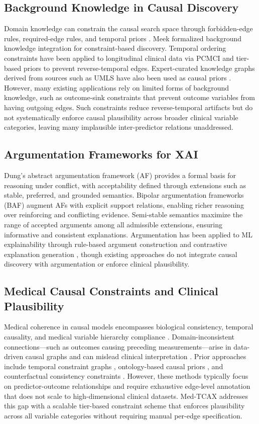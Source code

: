 \documentclass[conference, a4paper]{IEEEtran}
\begin{document}
\subsection{Background Knowledge in Causal Discovery}
Domain knowledge can constrain the causal search space through forbidden-edge rules, required-edge rules, and temporal priors \cite{ref16}. Meek \cite{ref17} formalized background knowledge integration for constraint-based discovery. Temporal ordering constraints have been applied to longitudinal clinical data via PCMCI \cite{ref18} and tier-based priors \cite{ref19} to prevent reverse-temporal edges. Expert-curated knowledge graphs derived from sources such as UMLS have also been used as causal priors \cite{ref20}. However, many existing applications rely on limited forms of background knowledge, such as outcome-sink constraints that prevent outcome variables from having outgoing edges. Such constraints reduce reverse-temporal artifacts but do not systematically enforce causal plausibility across broader clinical variable categories, leaving many implausible inter-predictor relations unaddressed.

\subsection{Argumentation Frameworks for XAI}
Dung's abstract argumentation framework (AF) \cite{ref21} provides a formal basis for reasoning under conflict, with acceptability defined through extensions such as stable, preferred, and grounded semantics. Bipolar argumentation frameworks (BAF) \cite{ref22} augment AFs with explicit support relations, enabling richer reasoning over reinforcing and conflicting evidence. Semi-stable semantics \cite{ref23} maximize the range of accepted arguments among all admissible extensions, ensuring informative and consistent explanations. Argumentation has been applied to ML explainability through rule-based argument construction \cite{ref24} and contrastive explanation generation \cite{ref25}, though existing approaches do not integrate causal discovery with argumentation or enforce clinical plausibility.

\subsection{Medical Causal Constraints and Clinical Plausibility}
Medical coherence in causal models encompasses biological consistency, temporal causality, and medical variable hierarchy compliance \cite{ref7, ref26}. Domain-inconsistent connections—such as outcomes causing preceding measurements—arise in data-driven causal graphs and can mislead clinical interpretation \cite{ref27}. Prior approaches include temporal constraint graphs \cite{ref18}, ontology-based causal priors \cite{ref20}, and counterfactual consistency constraints \cite{ref28}. However, these methods typically focus on predictor-outcome relationships and require exhaustive edge-level annotation that does not scale to high-dimensional clinical datasets. Med-TCAX addresses this gap with a scalable tier-based constraint scheme that enforces plausibility across all variable categories without requiring manual per-edge specification.
\end{document}
